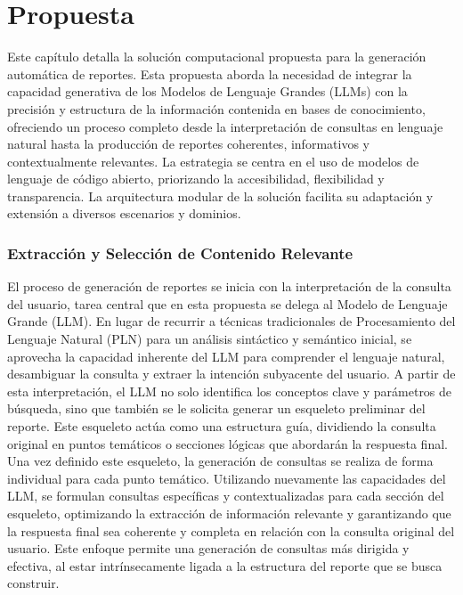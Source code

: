 \chapter{Propuesta}\label{chapter:proposal}

Este capítulo detalla la solución computacional propuesta para la generación automática de reportes. Esta propuesta aborda la necesidad de integrar la capacidad generativa de los Modelos de Lenguaje Grandes (LLMs) con la precisión y estructura de la información contenida en bases de conocimiento, ofreciendo un proceso completo desde la interpretación de consultas en lenguaje natural hasta la producción de reportes coherentes, informativos y contextualmente relevantes. La estrategia se centra en el uso de modelos de lenguaje de código abierto, priorizando la accesibilidad, flexibilidad y transparencia. La arquitectura modular de la solución facilita su adaptación y extensión a diversos escenarios y dominios.

\subsection{Extracción y Selección de Contenido Relevante}

El proceso de generación de reportes se inicia con la interpretación de la consulta del usuario, tarea central que en esta propuesta se delega al Modelo de Lenguaje Grande (LLM). En lugar de recurrir a técnicas tradicionales de Procesamiento del Lenguaje Natural (PLN) para un análisis sintáctico y semántico inicial, se aprovecha la capacidad inherente del LLM para comprender el lenguaje natural, desambiguar la consulta y extraer la intención subyacente del usuario. A partir de esta interpretación, el LLM no solo identifica los conceptos clave y parámetros de búsqueda, sino que también se le solicita generar un esqueleto preliminar del reporte.
Este esqueleto actúa como una estructura guía, dividiendo la consulta original en puntos temáticos o secciones lógicas que abordarán la respuesta final. Una vez definido este esqueleto, la generación de consultas se realiza de forma individual para cada punto temático. Utilizando nuevamente las capacidades del LLM, se formulan consultas específicas y contextualizadas para cada sección del esqueleto, optimizando la extracción de información relevante y garantizando que la respuesta final sea coherente y completa en relación con la consulta original del usuario. Este enfoque permite una generación de consultas más dirigida y efectiva, al estar intrínsecamente ligada a la estructura del reporte que se busca construir.


